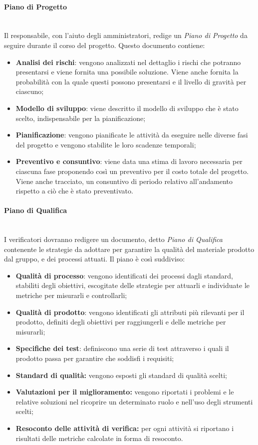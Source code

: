 		\paragraph{Piano di Progetto} \mbox{}\\
		Il responsabile, con l'aiuto degli amministratori, redige un \textit{Piano di Progetto} da seguire durante il corso del progetto. Questo documento contiene:
		\begin{itemize}
			\item \textbf{Analisi dei rischi}: vengono analizzati nel dettaglio i rischi che potranno presentarsi e viene fornita una possibile soluzione. Viene anche fornita la probabilità con la quale questi possono presentarsi e il livello di gravità per ciascuno;
			\item \textbf{Modello di sviluppo}: viene descritto il modello di sviluppo che è stato scelto, indispensabile per la pianificazione;
			\item \textbf{Pianificazione}: vengono pianificate le attività da eseguire nelle diverse fasi del progetto e vengono stabilite le loro scadenze temporali;
			\item \textbf{Preventivo e consuntivo}: viene data una stima di lavoro necessaria per ciascuna fase proponendo così un preventivo per il costo totale del progetto. Viene anche tracciato, un consuntivo di periodo relativo all'andamento rispetto a ciò che è stato preventivato.
		\end{itemize}
		\paragraph{Piano di Qualifica} \mbox{}\\
		I verificatori dovranno redigere un documento, detto \textit{Piano di Qualifica} contenente le strategie da adottare per garantire la qualità del materiale prodotto dal gruppo, e dei processi attuati. Il piano è così suddiviso:
		\begin{itemize}
			\item \textbf{Qualità di processo}: vengono identificati dei processi dagli standard, stabiliti degli obiettivi, escogitate delle strategie per attuarli e individuate le metriche per misurarli e controllarli;
			\item \textbf{Qualità di prodotto}: vengono identificati gli attributi più rilevanti per il prodotto, definiti degli obiettivi per raggiungerli e delle metriche per misurarli;
			\item \textbf{Specifiche dei test}: definiscono una serie di test attraverso i quali il prodotto passa per garantire che soddisfi i requisiti;
			\item \textbf{Standard di qualità:} vengono esposti gli standard di qualità scelti;
			\item \textbf{Valutazioni per il miglioramento:} vengono riportati i problemi e le relative soluzioni nel ricoprire un determinato ruolo e nell'uso degli strumenti scelti;
			\item \textbf{Resoconto delle attività di verifica:} per ogni attività si riportano i risultati delle metriche calcolate in forma di resoconto.
		\end{itemize}
